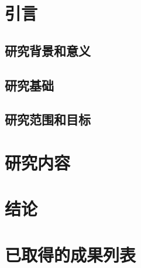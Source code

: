 \section{引言}
\subsection{研究背景和意义}


\subsection{研究基础}
\subsection{研究范围和目标}


\clearpage
\section{研究内容}



\clearpage
\section{结论}


\clearpage
\section{已取得的成果列表}


\clearpage
